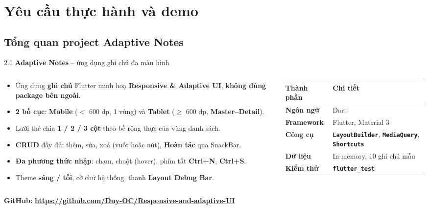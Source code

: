 \documentclass[aspectratio=169,10pt]{beamer}
\newcommand{\api}[1]{\texttt{\bfseries #1}}   %
\begin{document}
\section{Yêu cầu thực hành và demo}
\subsection{Tổng quan project Adaptive Notes}

\begin{frame}{2.1 \textbf{Adaptive Notes} -- ứng dụng ghi chú đa màn hình}
  \begin{columns}[T]
    \begin{column}{0.54\textwidth}
      \small
      \begin{itemize}\itemsep3pt
        \item Ứng dụng \textbf{ghi chú} Flutter minh hoạ \textbf{Responsive \& Adaptive UI}, \textbf{không dùng package bên ngoài}.
        \item \textbf{2 bố cục}: \textbf{Mobile} ($<$ 600 dp, 1 vùng) và \textbf{Tablet} ($\geq$ 600 dp, \textbf{Master--Detail}).
        \item Lưới thẻ chia \textbf{1 / 2 / 3 cột} theo bề rộng thực của vùng danh sách.
        \item \textbf{CRUD} đầy đủ: thêm, sửa, xoá (vuốt hoặc nút), \textbf{Hoàn tác} qua SnackBar.
        \item \textbf{Đa phương thức nhập}: chạm, chuột (hover), phím tắt \textbf{Ctrl+N}, \textbf{Ctrl+S}.
        \item Theme \textbf{sáng / tối}, cỡ chữ hệ thống, thanh \textbf{Layout Debug Bar}.
      \end{itemize}
    \end{column}
    \begin{column}{0.44\textwidth}
      \footnotesize
      \renewcommand{\arraystretch}{1.4}
      \begin{tabular}{@{}>{\raggedright\arraybackslash}p{1.9cm}>{\raggedright\arraybackslash}p{3.8cm}@{}}
        \hline
        \rowcolor{cHead}\textbf{Thành phần} & \textbf{Chi tiết}\\ \hline
        \textbf{Ngôn ngữ} & Dart\\ \hline
        \textbf{Framework} & Flutter, Material 3\\ \hline
        \textbf{Công cụ} & \api{LayoutBuilder}, \api{MediaQuery}, \api{Shortcuts}\\ \hline
        \textbf{Dữ liệu} & In-memory, 10 ghi chú mẫu\\ \hline
        \textbf{Kiểm thử} & \api{flutter\_test}\\ \hline
      \end{tabular}
    \end{column}
  \end{columns}
  \vspace{6pt}
  \small \textbf{GitHub:} {\bfseries\footnotesize\url{https://github.com/Duy-OC/Responsive-and-adaptive-UI}}
\end{frame}
\end{document}

